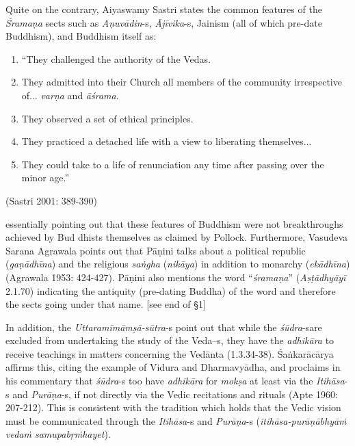 Quite on the contrary, Aiyaswamy Sastri states the common features of the \textit{Śramaṇa} sects such as \textit{Aṇuvādin}-s, \textit{Ājīvika}-s, Jainism (all of which pre-date Buddhism), and Buddhism itself as:

\begin{enumerate}
\itemsep=0pt
\item “They challenged the authority of the Vedas.

 \item They admitted into their Church all members of the community irrespective of... \textit{varṇa} and \textit{āśrama}.

 \item They observed a set of ethical principles.

 \item They practiced a detached life with a view to liberating themselves...

 \item They could take to a life of renunciation any time after passing over the minor age.”

\end{enumerate}

\vspace{-.6cm}

\begin{flushright}
(Sastri 2001: 389-390)
\end{flushright}

essentially pointing out that these features of Buddhism were not breakthroughs achieved by Bud dhists themselves as claimed by Pollock. Furthermore, Vasudeva Sarana Agrawala points out that Pāṇini talks about a political republic (\textit{gaṇādhīna}) and the religious \textit{saṅgha} (\textit{nikāya}) in addition to monarchy (\textit{ekādhīna}) (Agrawala 1953: 424-427). Pāṇini also mentions the word “\textit{śramaṇa}” (\textit{Aṣṭādhyāyī} 2.1.70) indicating the antiquity (pre-dating Buddha) of the word and therefore the sects going under that name. [see end of §1]

In addition, the \textit{Uttaramīmāmṣā-sūtra}-s point out that while the \textit{śūdra}-s\break are excluded from undertaking the study of the Veda--s, they have the \textit{adhikāra} to receive teachings in matters concerning the Vedānta (1.3.34-38). Śaṅkarācārya affirms this, citing the example of Vidura and Dharmavyādha, and proclaims in his commentary that \textit{śūdra}-s too have \textit{adhikāra} for \textit{mokṣa} at least via the \textit{Itihāsa}-s and \textit{Purāṇa}-s, if not directly via the Vedic recitations and rituals (Apte 1960: 207-212). This is consistent with the tradition which holds that the Vedic vision must be communicated through the \textit{Itihāsa}-s and \textit{Purāṇa}-s (\textit{itihāsa-purāṇābhyāṁ vedaṁ samupabṛṁhayet}).

